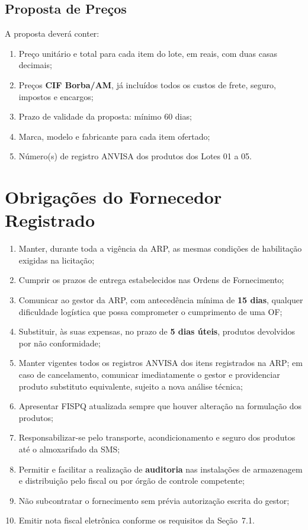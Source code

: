\documentclass[12pt,a4paper]{article}
\begin{document}
\subsection{Proposta de Preços}

A proposta deverá conter:

\begin{enumerate}
  \item Preço unitário e total para cada item do lote, em reais, com duas casas decimais;
  \item Preços \textbf{CIF Borba/AM}, já incluídos todos os custos de frete, seguro,
    impostos e encargos;
  \item Prazo de validade da proposta: mínimo 60 dias;
  \item Marca, modelo e fabricante para cada item ofertado;
  \item Número(s) de registro ANVISA dos produtos dos Lotes 01 a 05.
\end{enumerate}

\section{Obrigações do Fornecedor Registrado}

\begin{enumerate}
  \item Manter, durante toda a vigência da ARP, as mesmas condições de habilitação
    exigidas na licitação;
  \item Cumprir os prazos de entrega estabelecidos nas Ordens de Fornecimento;
  \item Comunicar ao gestor da ARP, com antecedência mínima de \textbf{15 dias},
    qualquer dificuldade logística que possa comprometer o cumprimento de uma OF;
  \item Substituir, às suas expensas, no prazo de \textbf{5 dias úteis}, produtos
    devolvidos por não conformidade;
  \item Manter vigentes todos os registros ANVISA dos itens registrados na ARP; em
    caso de cancelamento, comunicar imediatamente o gestor e providenciar produto
    substituto equivalente, sujeito a nova análise técnica;
  \item Apresentar FISPQ atualizada sempre que houver alteração na formulação dos
    produtos;
  \item Responsabilizar-se pelo transporte, acondicionamento e seguro dos produtos
    até o almoxarifado da SMS;
  \item Permitir e facilitar a realização de \textbf{auditoria} nas instalações de
    armazenagem e distribuição pelo fiscal ou por órgão de controle competente;
  \item Não subcontratar o fornecimento sem prévia autorização escrita do gestor;
  \item Emitir nota fiscal eletrônica conforme os requisitos da Seção~7.1.
\end{enumerate}
\end{document}
